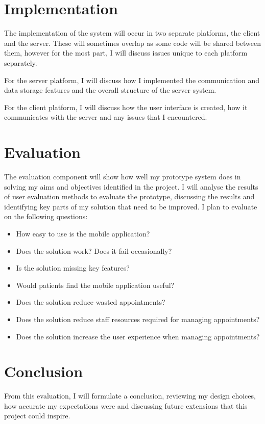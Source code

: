 \section{Implementation}

The implementation of the system will occur in two separate platforms, the client and the server. These will sometimes overlap as some code will be shared between them, however for the most part, I will discuss issues unique to each platform separately.

For the server platform, I will discuss how I implemented the communication and data storage features and the overall structure of the server system.

For the client platform, I will discuss how the user interface is created, how it communicates with the server and any issues that I encountered.


\section{Evaluation}

The evaluation component will show how well my prototype system does in solving my aims and objectives identified in the project. I will analyse the results of user evaluation methods to evaluate the prototype, discussing the results and identifying key parts of my solution that need to be improved. I plan to evaluate on the following questions:

\begin{itemize}
	\item How easy to use is the mobile application?
	\item Does the solution work? Does it fail occasionally?
	\item Is the solution missing key features?
	\item Would patients find the mobile application useful?
	\item Does the solution reduce wasted appointments?
	\item Does the solution reduce staff resources required for managing appointments?
	\item Does the solution increase the user experience when managing appointments?
\end{itemize}

\section{Conclusion}

From this evaluation, I will formulate a conclusion, reviewing my design choices, how accurate my expectations were and discussing future extensions that this project could inspire.

